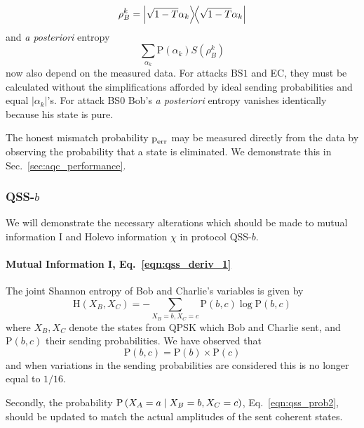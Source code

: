 \begin{equation}
\rho_B^k = \dyad{\sqrt{1-T}\alpha_k}
\end{equation} 
and \emph{a posteriori} entropy
\begin{equation}
\sum_{\alpha_k}\text{P}\left(\alpha_k\right) S\left(\rho_B^k\right)
\end{equation}
now also depend on the measured data. For attacks BS$1$ and EC, they must be calculated without the simplifications afforded by ideal sending probabilities and equal $\left|\alpha_k\right|$'s. For attack BS$0$ Bob's \emph{a posteriori} entropy vanishes identically because his state is pure.

The honest mismatch probability $\text{p}_{\text{err}}$ may be measured directly from the data by observing the probability that a state is eliminated. We demonstrate this in Sec.~\ref{sec:aqc_performance}.


\subsubsection{QSS-$b$}
We will demonstrate the necessary alterations which should be made to mutual information I and Holevo information $\chi$ in protocol QSS-$b$.

\paragraph{Mutual Information I, Eq.~\ref{eqn:qss_deriv_1}}
The joint Shannon entropy of Bob and Charlie's variables is given by
\begin{equation}
\text{H}\left(X_B, X_C\right) = - \sum_{X_B=b, X_C=c} \text{P}\left(b, c\right) \log \text{P}\left(b, c\right)
\end{equation}
where $X_B, X_C$ denote the states from QPSK which Bob and Charlie sent, and $\text{P}\left(b, c\right)$ their sending probabilities. We have observed that
\begin{equation}
\text{P}\left(b, c\right) = \text{P}\left(b\right) \times \text{P}\left(c\right)
\end{equation}
and when variations in the sending probabilities are considered this is no longer equal to $1/16$. 

Secondly, the probability $\text{P}\left(X_A=a \; \middle| \; X_B=b, X_C=c\right)$, Eq.~\ref{eqn:qss_prob2}, should be updated to match the actual amplitudes of the sent coherent states.

